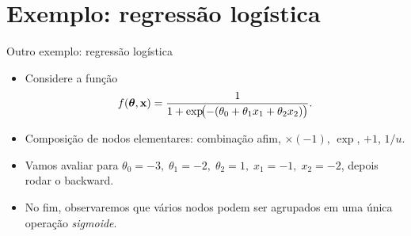 \documentclass[aspectratio=169,xcolor=dvipsnames]{beamer}
\begin{document}
  \section{Exemplo: regressão logística}

  \begin{frame}{Outro exemplo: regressão logística}
    \begin{itemize}
      \item Considere a função
        $$f(\bm{\theta}, \mathbf{x}) = \frac{1}{1 + \exp\!\bigl(-(\theta_0 + \theta_1 x_1 + \theta_2 x_2)\bigr)}.$$
      \item Composição de nodos elementares: combinação afim,
        $\times(-1)$, $\exp$, $+1$, $1/u$.
      \item Vamos avaliar para
        $\theta_0 = -3,\; \theta_1 = -2,\; \theta_2 = 1,\;
         x_1 = -1,\; x_2 = -2$, depois rodar o backward.
      \item No fim, observaremos que vários nodos podem ser agrupados
        em uma única operação \textit{sigmoide}.
    \end{itemize}
  \end{frame}
\end{document}
